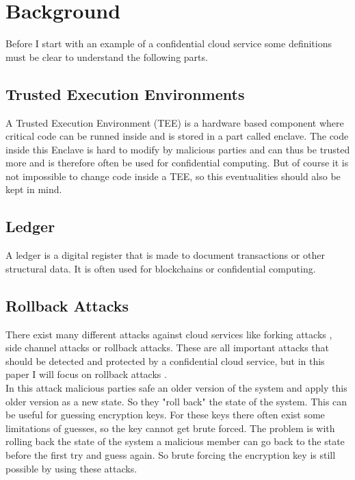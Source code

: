 \section{Background}
Before I start with an example of a confidential cloud service some definitions must be clear to understand the following parts.
\subsection{Trusted Execution Environments}
A Trusted Execution Environment (TEE) is a hardware based component where critical code can be runned inside and is stored in a part called enclave. The code inside this Enclave is hard to modify by malicious parties and can thus be trusted more and is therefore often be used for confidential computing.  But of course it is not impossible to change code inside a TEE, so this eventualities should also be kept in mind. %
\subsection{Ledger}
A ledger is a digital register that is made to document transactions or other structural data. It is often used for blockchains or confidential computing.\subsection{Rollback Attacks}
There exist many different attacks against cloud services like forking attacks \cite{forkingAttacks}, side channel attacks \cite{sideChannel} or rollback attacks. These are all important attacks that should be detected and protected by a confidential cloud service, but in this paper I will focus on rollback attacks \cite{Rollback}.\\
In this attack malicious parties safe an older version of the system and apply this older version as a new state. So they "roll back" the state of the system. This can be useful for guessing encryption keys. For these keys there often exist some limitations of guesses, so the key cannot get brute forced. The problem is with rolling back the state of the system a malicious member can go back to the state before the first try and guess again. So brute forcing the encryption key is still possible by using these attacks. 